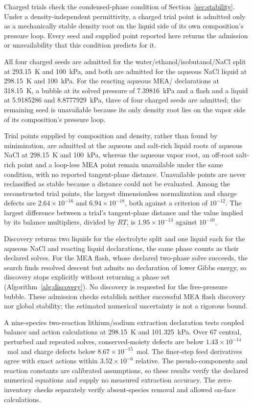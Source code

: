 Charged trials check the condensed-phase condition of Section~\ref{sec:stability}.
Under a density-independent permittivity, a charged trial point is admitted only as a mechanically stable density root on the liquid side of its own composition's pressure loop.
Every seed and supplied point reported here returns the admission or unavailability that this condition predicts for it.

All four charged seeds are admitted for the water/ethanol/isobutanol/NaCl split at 293.15~K and 100~kPa, and both are admitted for the aqueous NaCl liquid at 298.15~K and 100~kPa.
For the reacting aqueous MEA/ declarations at 318.15~K, a bubble at its solved pressure of 7.39816~kPa and a flash and a liquid at 5.9185286 and 8.8777929~kPa, three of four charged seeds are admitted; the remaining seed is unavailable because its only density root lies on the vapor side of its composition's pressure loop.

Trial points supplied by composition and density, rather than found by minimization, are admitted at the aqueous and salt-rich liquid roots of aqueous NaCl at 298.15~K and 100~kPa, whereas the aqueous vapor root, an off-root salt-rich point and a loop-less MEA point remain unavailable under the same condition, with no reported tangent-plane distance.
Unavailable points are never reclassified as stable because a distance could not be evaluated.
Among the reconstructed trial points, the largest dimensionless normalization and charge defects are $2.64\times10^{-16}$ and $6.94\times10^{-18}$, both against a criterion of $10^{-12}$.
The largest difference between a trial's tangent-plane distance and the value implied by its balance multipliers, divided by $RT$, is $1.95\times10^{-13}$ against $10^{-10}$.

Discovery returns two liquids for the electrolyte split and one liquid each for the aqueous NaCl and reacting liquid declarations, the same phase counts as their declared solves.
For the MEA flash, whose declared two-phase solve succeeds, the search finds resolved descent but admits no declaration of lower Gibbs energy, so discovery stops explicitly without returning a phase set (Algorithm~\ref{alg:discovery}).
No discovery is requested for the free-pressure bubble.
These admission checks establish neither successful MEA flash discovery nor global stability; the estimated numerical uncertainty is not a rigorous bound.

A nine-species two-reaction lithium/sodium extraction declaration tests coupled balance and action calculations at 298.15~K and 101.325~kPa.
Over 67 central, perturbed and repeated solves, conserved-moiety defects are below $1.43\times10^{-14}$~mol and charge defects below $8.67\times10^{-15}$~mol.
The finer-step feed derivatives agree with exact actions within $3.52\times10^{-6}$ relative.
The pseudo-components and reaction constants are calibrated assumptions, so these results verify the declared numerical equations and supply no measured extraction accuracy.
The zero-inventory checks separately verify absent-species removal and allowed on-face calculations.

